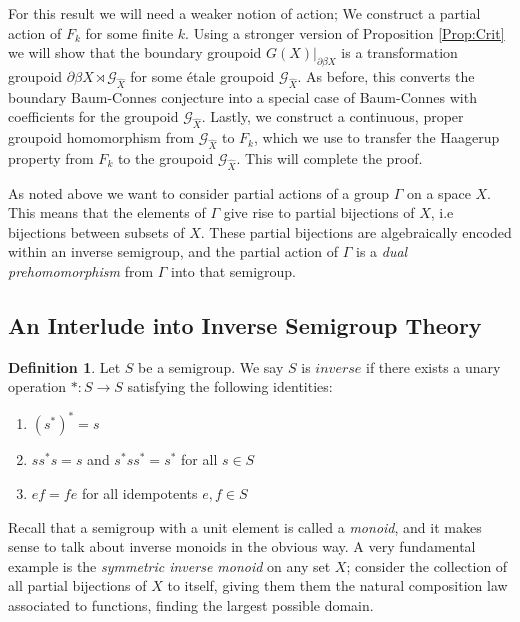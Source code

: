\documentclass[11pt]{amsart}
\theoremstyle{plain}
\theoremstyle{definition}%
\newtheorem{definition}[theorem]{Definition}%
\theoremstyle{remark}%
\newcommand{\G}{\mathcal{G}}
\begin{document}
For this result we will need a weaker notion of action; We construct a partial action of $F_{k}$ for some finite $k$. Using a stronger version of Proposition \ref{Prop:Crit} we will show that the boundary groupoid $G(X)|_{\partial\beta X}$ is a transformation groupoid $\partial\beta X \rtimes \G_{\widehat{X}}$ for some \'etale groupoid $\G_{\widehat{X}}$. As before, this converts the boundary Baum-Connes conjecture into a special case of Baum-Connes with coefficients for the groupoid $\G_{\widehat{X}}$. Lastly, we construct a continuous, proper groupoid homomorphism from $\G_{\widehat{X}}$ to $F_{k}$, which we use to transfer the Haagerup property from $F_{k}$ to the groupoid $\G_{\widehat{X}}$. This will complete the proof.

As noted above we want to consider partial actions of a group $\Gamma$ on a space $X$. This means that the elements of $\Gamma$ give rise to partial bijections of $X$, i.e bijections between subsets of $X$. These partial bijections are algebraically encoded within an inverse semigroup, and the partial action of $\Gamma$ is a \textit{dual prehomomorphism} from $\Gamma$ into that semigroup.

\subsection{An Interlude into Inverse Semigroup Theory}\label{Sect:SemiToGpoid}
                                                                               
\begin{definition}\label{Def:invsemi}
Let $S$ be a semigroup. We say $S$ is $inverse$ if there exists a unary operation $*:S \rightarrow S$ satisfying the following identities:
\begin{enumerate}
\item $(s^{*})^{*}=s$
\item $ss^{*}s=s$ and $s^{*}ss^{*}=s^{*}$ for all $s \in S$
\item $ef=fe$ for all idempotents $e,f \in S$ 
\end{enumerate}
\end{definition}

Recall that a semigroup with a unit element is called a \textit{monoid}, and it makes sense to talk about inverse monoids in the obvious way. A very fundamental example is the \textit{symmetric inverse monoid} on any set $X$; consider the collection of all partial bijections of $X$ to itself, giving them them the natural composition law associated to functions, finding the largest possible domain.
\end{document}
